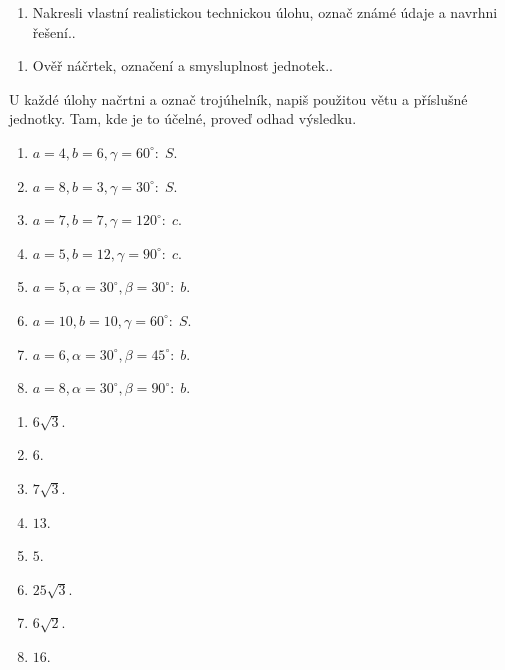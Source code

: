 \documentclass[11pt,a4paper]{article}
\begin{document}
\begin{zadaniReseniBox}[title={Rozšíření 1}]
\begin{enumerate}[label=\alph*)]
\item Nakresli vlastní realistickou technickou úlohu, označ známé údaje a navrhni řešení..
\end{enumerate}
\tcblower
\begin{enumerate}[label=\alph*)]
\item Ověř náčrtek, označení a smysluplnost jednotek..
\end{enumerate}
\end{zadaniReseniBox}
U každé úlohy načrtni a označ trojúhelník, napiš použitou větu a příslušné jednotky. Tam, kde je to účelné, proveď odhad výsledku.
\begin{zadaniReseniBox}[title={Domácí úkol}]
\begin{enumerate}[label=\alph*)]
\item $a=4,b=6,\gamma=60^\circ:\;S$.
\item $a=8,b=3,\gamma=30^\circ:\;S$.
\item $a=7,b=7,\gamma=120^\circ:\;c$.
\item $a=5,b=12,\gamma=90^\circ:\;c$.
\item $a=5,\alpha=30^\circ,\beta=30^\circ:\;b$.
\item $a=10,b=10,\gamma=60^\circ:\;S$.
\item $a=6,\alpha=30^\circ,\beta=45^\circ:\;b$.
\item $a=8,\alpha=30^\circ,\beta=90^\circ:\;b$.
\end{enumerate}
\tcblower
\begin{enumerate}[label=\alph*)]
\item $6\sqrt3$.
\item $6$.
\item $7\sqrt3$.
\item $13$.
\item $5$.
\item $25\sqrt3$.
\item $6\sqrt2$.
\item $16$.
\end{enumerate}
\end{zadaniReseniBox}
\end{document}
